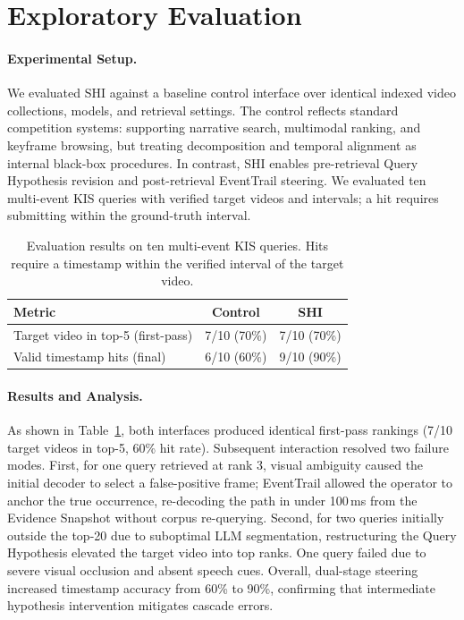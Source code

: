 \section{Exploratory Evaluation}
\label{sec:evaluation}

\paragraph{Experimental Setup.}
We evaluated SHI against a baseline control interface over identical indexed video
collections, models, and retrieval settings. The control reflects standard competition
systems: supporting narrative search, multimodal ranking, and keyframe browsing, but
treating decomposition and temporal alignment as internal black-box procedures. In
contrast, SHI enables pre-retrieval Query Hypothesis revision and post-retrieval
EventTrail steering. We evaluated ten multi-event KIS queries with verified target
videos and intervals; a hit requires submitting within the ground-truth interval.

\begin{table}[!t]
  \centering
  \caption{Evaluation results on ten multi-event KIS queries. Hits require a
  timestamp within the verified interval of the target video.}
  \label{tab:kis-benchmark}
  \begin{tabular}{lcc}
    \hline
    Metric & Control & SHI \\
    \hline
    Target video in top-5 (first-pass) & 7/10 (70\%) & 7/10 (70\%) \\
    Valid timestamp hits (final) & 6/10 (60\%) & 9/10 (90\%) \\
    \hline
  \end{tabular}
\end{table}

\paragraph{Results and Analysis.}
As shown in Table~\ref{tab:kis-benchmark}, both interfaces produced identical
first-pass rankings (7/10 target videos in top-5, 60\% hit rate). Subsequent
interaction resolved two failure modes. First, for one query retrieved at rank 3,
visual ambiguity caused the initial decoder to select a false-positive frame;
EventTrail allowed the operator to anchor the true occurrence, re-decoding the
path in under 100\,ms from the Evidence Snapshot without corpus re-querying.
Second, for two queries initially outside the top-20 due to suboptimal LLM
segmentation, restructuring the Query Hypothesis elevated the target video into
top ranks. One query failed due to severe visual occlusion and absent speech cues.
Overall, dual-stage steering increased timestamp accuracy from 60\% to 90\%,
confirming that intermediate hypothesis intervention mitigates cascade errors.


